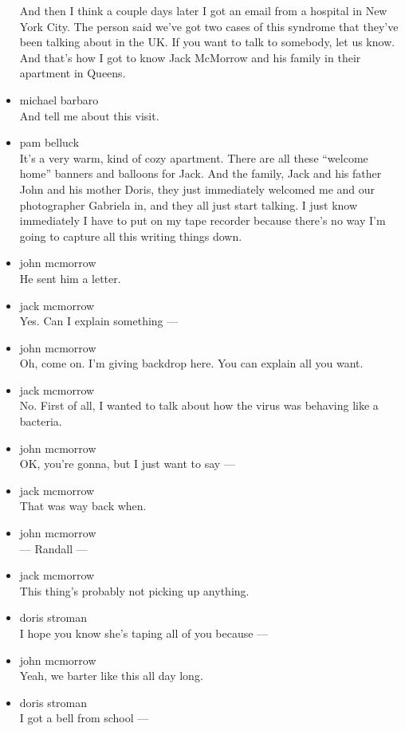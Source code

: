 \begin{itemize}
  And then I think a couple days later I got an email from a hospital in
  New York City. The person said we've got two cases of this syndrome
  that they've been talking about in the UK. If you want to talk to
  somebody, let us know. And that's how I got to know Jack McMorrow and
  his family in their apartment in Queens.
\item
  michael barbaro\\
  And tell me about this visit.
\item
  pam belluck\\
  It's a very warm, kind of cozy apartment. There are all these
  ``welcome home'' banners and balloons for Jack. And the family, Jack
  and his father John and his mother Doris, they just immediately
  welcomed me and our photographer Gabriela in, and they all just start
  talking. I just know immediately I have to put on my tape recorder
  because there's no way I'm going to capture all this writing things
  down.
\item
  john mcmorrow\\
  He sent him a letter.
\item
  jack mcmorrow\\
  Yes. Can I explain something ---
\item
  john mcmorrow\\
  Oh, come on. I'm giving backdrop here. You can explain all you want.
\item
  jack mcmorrow\\
  No. First of all, I wanted to talk about how the virus was behaving
  like a bacteria.
\item
  john mcmorrow\\
  OK, you're gonna, but I just want to say ---
\item
  jack mcmorrow\\
  That was way back when.
\item
  john mcmorrow\\
  --- Randall ---
\item
  jack mcmorrow\\
  This thing's probably not picking up anything.
\item
  doris stroman\\
  I hope you know she's taping all of you because ---
\item
  john mcmorrow\\
  Yeah, we barter like this all day long.
\item
  doris stroman\\
  I got a bell from school ---

\end{itemize}
